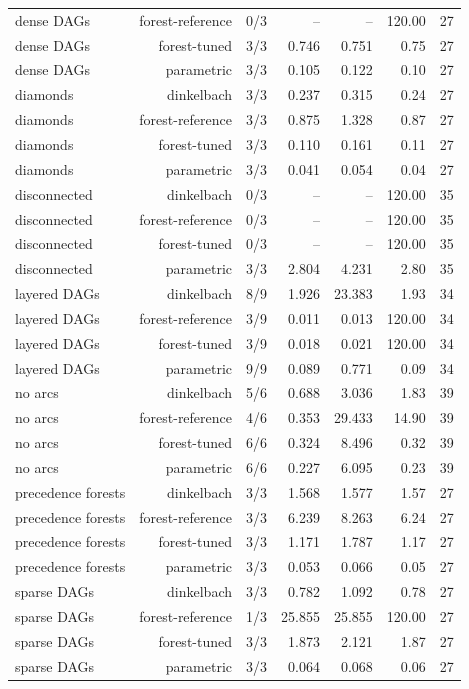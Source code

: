 {\begin{longtable}{lrrrrrr}
dense DAGs & forest-reference & 0/3 & -- & -- & 120.00 & 27 \\
dense DAGs & forest-tuned & 3/3 & 0.746 & 0.751 & 0.75 & 27 \\
dense DAGs & parametric & 3/3 & 0.105 & 0.122 & 0.10 & 27 \\
diamonds & dinkelbach & 3/3 & 0.237 & 0.315 & 0.24 & 27 \\
diamonds & forest-reference & 3/3 & 0.875 & 1.328 & 0.87 & 27 \\
diamonds & forest-tuned & 3/3 & 0.110 & 0.161 & 0.11 & 27 \\
diamonds & parametric & 3/3 & 0.041 & 0.054 & 0.04 & 27 \\
disconnected & dinkelbach & 0/3 & -- & -- & 120.00 & 35 \\
disconnected & forest-reference & 0/3 & -- & -- & 120.00 & 35 \\
disconnected & forest-tuned & 0/3 & -- & -- & 120.00 & 35 \\
disconnected & parametric & 3/3 & 2.804 & 4.231 & 2.80 & 35 \\
layered DAGs & dinkelbach & 8/9 & 1.926 & 23.383 & 1.93 & 34 \\
layered DAGs & forest-reference & 3/9 & 0.011 & 0.013 & 120.00 & 34 \\
layered DAGs & forest-tuned & 3/9 & 0.018 & 0.021 & 120.00 & 34 \\
layered DAGs & parametric & 9/9 & 0.089 & 0.771 & 0.09 & 34 \\
no arcs & dinkelbach & 5/6 & 0.688 & 3.036 & 1.83 & 39 \\
no arcs & forest-reference & 4/6 & 0.353 & 29.433 & 14.90 & 39 \\
no arcs & forest-tuned & 6/6 & 0.324 & 8.496 & 0.32 & 39 \\
no arcs & parametric & 6/6 & 0.227 & 6.095 & 0.23 & 39 \\
precedence forests & dinkelbach & 3/3 & 1.568 & 1.577 & 1.57 & 27 \\
precedence forests & forest-reference & 3/3 & 6.239 & 8.263 & 6.24 & 27 \\
precedence forests & forest-tuned & 3/3 & 1.171 & 1.787 & 1.17 & 27 \\
precedence forests & parametric & 3/3 & 0.053 & 0.066 & 0.05 & 27 \\
sparse DAGs & dinkelbach & 3/3 & 0.782 & 1.092 & 0.78 & 27 \\
sparse DAGs & forest-reference & 1/3 & 25.855 & 25.855 & 120.00 & 27 \\
sparse DAGs & forest-tuned & 3/3 & 1.873 & 2.121 & 1.87 & 27 \\
sparse DAGs & parametric & 3/3 & 0.064 & 0.068 & 0.06 & 27 \\
\end{longtable}
}
